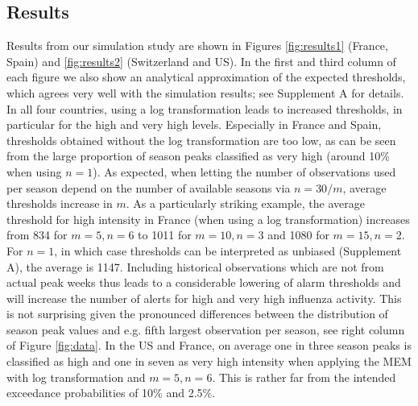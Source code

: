 \documentclass{article}
\begin{document}
\subsection{Results}

Results from our simulation study are shown in Figures \ref{fig:results1} (France, Spain) and \ref{fig:results2} (Switzerland and US). In the first and third column of each figure we also show an analytical approximation of the expected thresholds, which agrees very well with the simulation results; see Supplement A for details. In all four countries, using a log transformation leads to increased thresholds, in particular for the high and very high levels. Especially in France and Spain, thresholds obtained without the log transformation are too low, as can be seen from the large proportion of season peaks classified as very high (around 10\% when using $n = 1$). As expected, when letting the number of observations used per season depend on the number of available seasons via $n = 30/m$, average thresholds increase in $m$. As a particularly striking example, the  average threshold for high intensity in France (when using a log transformation) increases from 834 for $m = 5, n = 6$ to 1011 for $m = 10, n = 3$ and 1080 for $m = 15, n = 2$. For $n = 1$, in which case thresholds can be interpreted as unbiased (Supplement A), the average is 1147. Including historical observations which are not from actual peak weeks thus leads to a considerable lowering of alarm thresholds and will increase the number of alerts for high and very high influenza activity. This is not surprising given the pronounced differences between the distribution of season peak values and e.g. fifth largest observation per season, see right column of Figure \ref{fig:data}. In the US and France, on average one in three season peaks is classified as high and one in seven as very high intensity when applying the MEM with log transformation and $m = 5, n = 6$. This is rather far from the intended exceedance probabilities of 10\% and 2.5\%.
\end{document}
